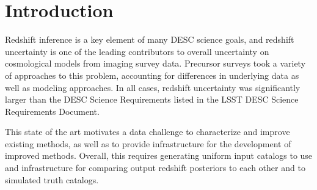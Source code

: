 \section{Introduction}
\label{sec:intro}

Redshift inference is a key element of many DESC science
goals, and redshift uncertainty is one of the leading contributors to
overall uncertainty on cosmological models from imaging survey
data.  Precursor surveys took a variety of approaches to this problem,
accounting for differences in underlying data as well as modeling
approaches.  In all cases, redshift uncertainty was significantly
larger than the DESC Science Requirements listed in the LSST DESC Science
Requirements Document.

This state of the art motivates a data challenge to characterize and
improve existing methods, as well as to provide infrastructure for the
development of improved methods. Overall, this requires generating
uniform input catalogs to use and infrastructure for comparing output
redshift posteriors to each other and to simulated truth catalogs.
